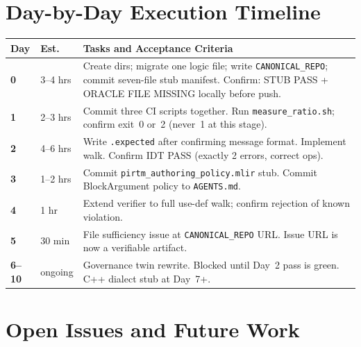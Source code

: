 \documentclass[11pt,letterpaper]{article}
\theoremstyle{pirtmthm}
\theoremstyle{remark}
\begin{document}
\section{Day-by-Day Execution Timeline}

\begin{center}
\renewcommand{\arraystretch}{1.35}
\begin{tabular}{@{}>{\bfseries}p{0.9cm}p{1.6cm}p{8.5cm}@{}}
  \toprule
  Day & Est. & Tasks and Acceptance Criteria \\
  \midrule
  0 & 3--4 hrs
    & Create dirs; migrate one logic file; write \texttt{CANONICAL\_REPO};
      commit seven-file stub manifest.
      Confirm: STUB PASS + ORACLE FILE MISSING locally before push. \\
  1 & 2--3 hrs
    & Commit three CI scripts together.
      Run \texttt{measure\_ratio.sh}; confirm exit~0 or~2 (never~1 at this stage). \\
  2 & 4--6 hrs
    & Write \texttt{.expected} after confirming message format.
      Implement walk. Confirm IDT PASS (exactly 2 errors, correct ops). \\
  3 & 1--2 hrs
    & Commit \texttt{pirtm\_authoring\_policy.mlir} stub.
      Commit BlockArgument policy to \texttt{AGENTS.md}. \\
  4 & 1 hr
    & Extend verifier to full use-def walk; confirm rejection of known violation. \\
  5 & 30 min
    & File sufficiency issue at \texttt{CANONICAL\_REPO} URL.
      Issue URL is now a verifiable artifact. \\
  6--10 & ongoing
    & Governance twin rewrite. Blocked until Day~2 pass is green.
      C++ dialect stub at Day~7+. \\
  \bottomrule
\end{tabular}
\end{center}

\section{Open Issues and Future Work}
\end{document}
